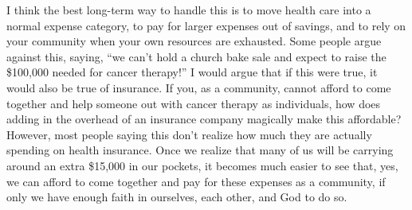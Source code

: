 I think the best long-term way to handle this is to move health care
into a normal expense category, to pay for larger expenses out of
savings, and to rely on your community when your own resources are
exhausted.  Some people argue against this, saying, ``we
can't hold a church bake sale and expect to raise the
\$100,000 needed for cancer therapy!''  I would argue that if this were
true, it would also be true of insurance.  If you, as a community,
cannot afford to come together and help someone out with cancer therapy
as individuals, how does adding in the overhead of an insurance company
magically make this affordable?  However, most people saying this
don't realize how much they are actually spending on health
insurance.  Once we realize that many of us will be carrying around an
extra \$15,000 in our pockets, it becomes much easier to see that, yes,
we can afford to come together and pay for these expenses as a
community, if only we have enough faith in ourselves, each other, and
God to do so.


